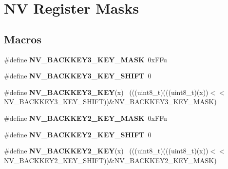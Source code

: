 \hypertarget{group___n_v___register___masks}{}\section{N\+V Register Masks}
\label{group___n_v___register___masks}
\subsection*{Macros}
\begin{DoxyCompactItemize}
\item 
\hypertarget{group___n_v___register___masks_gabe9123bc8137627b30e4f75c757cfb95}{}\#define {\bfseries N\+V\+\_\+\+B\+A\+C\+K\+K\+E\+Y3\+\_\+\+K\+E\+Y\+\_\+\+M\+A\+S\+K}~0x\+F\+Fu\label{group___n_v___register___masks_gabe9123bc8137627b30e4f75c757cfb95}

\item 
\hypertarget{group___n_v___register___masks_ga78b75e37d984596ddd9053d2125a78ff}{}\#define {\bfseries N\+V\+\_\+\+B\+A\+C\+K\+K\+E\+Y3\+\_\+\+K\+E\+Y\+\_\+\+S\+H\+I\+F\+T}~0\label{group___n_v___register___masks_ga78b75e37d984596ddd9053d2125a78ff}

\item 
\hypertarget{group___n_v___register___masks_ga60012399e688ca410ed3d4c7f58d5f91}{}\#define {\bfseries N\+V\+\_\+\+B\+A\+C\+K\+K\+E\+Y3\+\_\+\+K\+E\+Y}(x)                                          ~(((uint8\+\_\+t)(((uint8\+\_\+t)(x))$<$$<$N\+V\+\_\+\+B\+A\+C\+K\+K\+E\+Y3\+\_\+\+K\+E\+Y\+\_\+\+S\+H\+I\+F\+T))\&N\+V\+\_\+\+B\+A\+C\+K\+K\+E\+Y3\+\_\+\+K\+E\+Y\+\_\+\+M\+A\+S\+K)\label{group___n_v___register___masks_ga60012399e688ca410ed3d4c7f58d5f91}

\item 
\hypertarget{group___n_v___register___masks_ga5bf8822b0b59a321d9b5c30eb1618704}{}\#define {\bfseries N\+V\+\_\+\+B\+A\+C\+K\+K\+E\+Y2\+\_\+\+K\+E\+Y\+\_\+\+M\+A\+S\+K}~0x\+F\+Fu\label{group___n_v___register___masks_ga5bf8822b0b59a321d9b5c30eb1618704}

\item 
\hypertarget{group___n_v___register___masks_ga408b1083508e784cba76d5be9b147a84}{}\#define {\bfseries N\+V\+\_\+\+B\+A\+C\+K\+K\+E\+Y2\+\_\+\+K\+E\+Y\+\_\+\+S\+H\+I\+F\+T}~0\label{group___n_v___register___masks_ga408b1083508e784cba76d5be9b147a84}

\item 
\hypertarget{group___n_v___register___masks_ga5641a6e4f33b369fdcbefa85524b0610}{}\#define {\bfseries N\+V\+\_\+\+B\+A\+C\+K\+K\+E\+Y2\+\_\+\+K\+E\+Y}(x)                                          ~(((uint8\+\_\+t)(((uint8\+\_\+t)(x))$<$$<$N\+V\+\_\+\+B\+A\+C\+K\+K\+E\+Y2\+\_\+\+K\+E\+Y\+\_\+\+S\+H\+I\+F\+T))\&N\+V\+\_\+\+B\+A\+C\+K\+K\+E\+Y2\+\_\+\+K\+E\+Y\+\_\+\+M\+A\+S\+K)\label{group___n_v___register___masks_ga5641a6e4f33b369fdcbefa85524b0610}


\end{DoxyCompactItemize}
